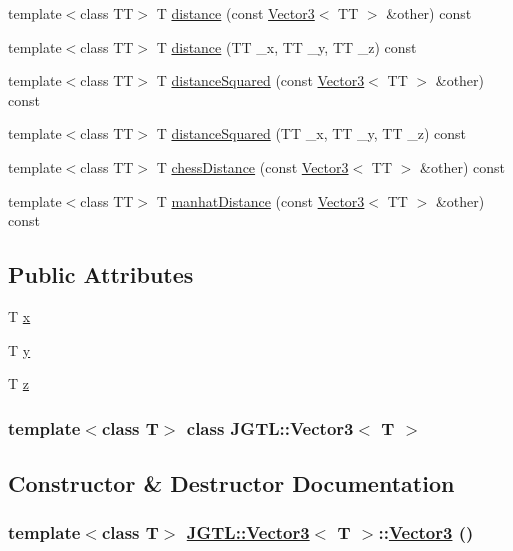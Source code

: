 \begin{CompactItemize}
\item 
template$<$class TT$>$ T \hyperlink{class_j_g_t_l_1_1_vector3_be8052114fb0572253a460583032166c}{distance} (const \hyperlink{class_j_g_t_l_1_1_vector3}{Vector3}$<$ TT $>$ \&other) const 
\item 
template$<$class TT$>$ T \hyperlink{class_j_g_t_l_1_1_vector3_e55adc165958fafafcfa9adfffe1ff95}{distance} (TT \_\-x, TT \_\-y, TT \_\-z) const 
\item 
template$<$class TT$>$ T \hyperlink{class_j_g_t_l_1_1_vector3_2e9c8d410cd86d2e7d21ac2eb2388e4e}{distance\-Squared} (const \hyperlink{class_j_g_t_l_1_1_vector3}{Vector3}$<$ TT $>$ \&other) const 
\item 
template$<$class TT$>$ T \hyperlink{class_j_g_t_l_1_1_vector3_7b0b15fa58322486fb84fdea770cbddc}{distance\-Squared} (TT \_\-x, TT \_\-y, TT \_\-z) const 
\item 
template$<$class TT$>$ T \hyperlink{class_j_g_t_l_1_1_vector3_70e5b9547233d0ae15a803586825f96b}{chess\-Distance} (const \hyperlink{class_j_g_t_l_1_1_vector3}{Vector3}$<$ TT $>$ \&other) const 
\item 
template$<$class TT$>$ T \hyperlink{class_j_g_t_l_1_1_vector3_191a2b4b58ac8d590ccc688d2bd1c71d}{manhat\-Distance} (const \hyperlink{class_j_g_t_l_1_1_vector3}{Vector3}$<$ TT $>$ \&other) const 
\end{CompactItemize}
\subsection*{Public Attributes}
\begin{CompactItemize}
\item 
T \hyperlink{class_j_g_t_l_1_1_vector3_088995b000b415dc8a66ef540212619c}{x}
\item 
T \hyperlink{class_j_g_t_l_1_1_vector3_9f621df88811d2765b8bc6dba68be9cd}{y}
\item 
T \hyperlink{class_j_g_t_l_1_1_vector3_8a58fe341555219f99448e6b03e592c2}{z}
\end{CompactItemize}
\subsubsection*{template$<$class T$>$ class JGTL::Vector3$<$ T $>$}



\subsection{Constructor \& Destructor Documentation}
\hypertarget{class_j_g_t_l_1_1_vector3_8a10ffb3bd80ce9978592f4f723b56dc}{
\subsubsection[Vector3]{\setlength{\rightskip}{0pt plus 5cm}template$<$class T$>$ \hyperlink{class_j_g_t_l_1_1_vector3}{JGTL::Vector3}$<$ T $>$::\hyperlink{class_j_g_t_l_1_1_vector3}{Vector3} ()}}
\label{class_j_g_t_l_1_1_vector3_8a10ffb3bd80ce9978592f4f723b56dc}


